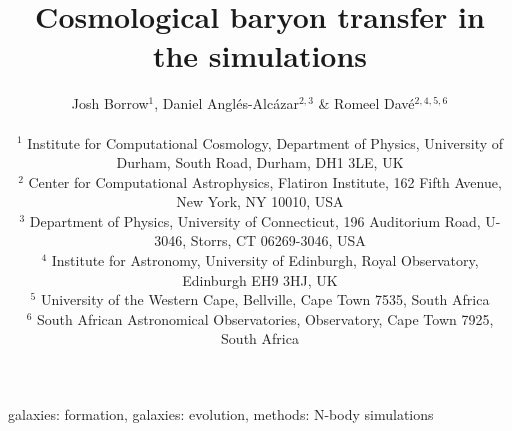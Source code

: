 \documentclass[fleqn,usenatbib]{mnras}
\title{Cosmological baryon transfer in the \simba{} simulations}
\author[Borrow et al.]{
Josh Borrow$^{1}$,
Daniel Angl\'es-Alc\'azar$^{2, 3}$ \&
Romeel Dav\'e$^{2, 4, 5, 6}$
\\
\\$^1$ Institute for Computational Cosmology, Department of Physics, University of Durham, South Road, Durham, DH1 3LE, UK
\\$^2$ Center for Computational Astrophysics, Flatiron Institute, 162 Fifth Avenue, New York, NY 10010, USA 
\\$^3$ Department of Physics, University of Connecticut, 196 Auditorium Road, U-3046, Storrs, CT 06269-3046, USA
\\$^4$ Institute for Astronomy, University of Edinburgh, Royal Observatory, Edinburgh EH9 3HJ, UK
\\$^5$ University of the Western Cape, Bellville, Cape Town 7535, South Africa
\\$^6$ South African Astronomical Observatories, Observatory, Cape Town 7925, South Africa
}
\begin{document}
\maketitle

\begin{abstract}\end{abstract}

\begin{keywords}galaxies: formation, galaxies: evolution, methods: N-body simulations\end{keywords}












\appendix


\bsp	%
\label{lastpage}
\end{document}
